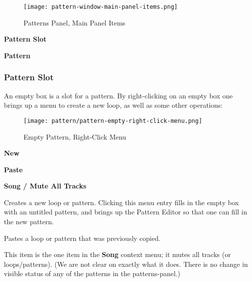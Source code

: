 \begin{figure}[H]
   \centering 
   \texttt{[image: pattern-window-main-panel-items.png]}
   \caption{Patterns Panel, Main Panel Items}
   \label{fig:pattern_window_main_panel_items}
\end{figure}

   \begin{enumber}
      \item \textbf{Pattern Slot}
      \item \textbf{Pattern}
   \end{enumber}

\subsubsection{Pattern Slot}
\label{subsubsec:seq24_patterns_pattern_slot}

   An empty box is a slot for a pattern.
   By right-clicking on an empty box one brings up a menu to create
   a new loop, as well as some other operations:

\begin{figure}[H]
   \centering 
   \texttt{[image: pattern/pattern-empty-right-click-menu.png]}
   \caption{Empty Pattern, Right-Click Menu}
   \label{fig:pattern_window_empty_right_click}
\end{figure}

   \begin{enumber}
      \item \textbf{New}
      \item \textbf{Paste}
      \item \textbf{Song / Mute All Tracks}
   \end{enumber}

   \setcounter{ItemCounter}{0}      %

   Creates a new loop or pattern.
   Clicking this menu entry fills in the empty box with an untitled
   pattern, and brings up the Pattern Editor
   so that one can fill in the new pattern.

   Pastes a loop or pattern that was previously copied.

   This item is the one item in the \textbf{Song} context menu;
   it mutes all tracks (or loops/patterns).  (We are not clear
   on exactly what it does.  There is no change in visible
   status of any of the patterns in the patterns-panel.)

